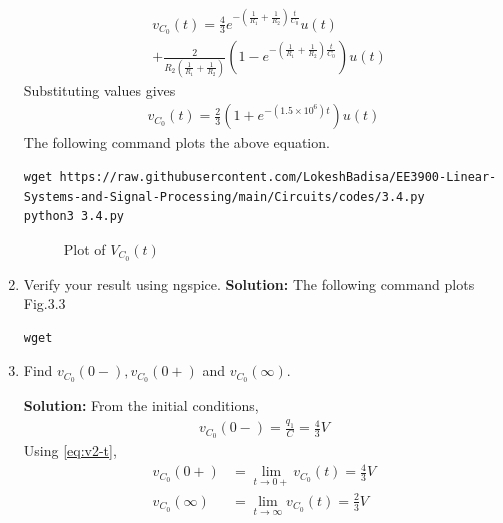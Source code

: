 \documentclass[journal,12pt,twocolumn]{IEEEtran}
\newcommand{\solution}{\noindent \textbf{Solution: }}
\providecommand{\brak}[1]{\ensuremath{\left(#1\right)}}
\numberwithin{equation}{section}
\renewcommand\thesection{\arabic{section}}
\begin{document}
\begin{enumerate}[label=\arabic*.,ref=\thesection.\theenumi]
\begin{align}
    &v_{C_0}(t) = \frac{4}{3}e^{-\brak{\frac{1}{R_1} + \frac{1}{R_2}}\frac{t}{C_0}}u(t) \nonumber \\ 
    &+ \frac{2}{R_2\brak{\frac{1}{R_1}+\frac{1}{R_2}}}\brak{1 - e^{-\brak{\frac{1}{R_1} + \frac{1}{R_2}}\frac{t}{C_0}}}u(t)
\end{align}
Substituting values gives
\begin{align}
    v_{C_0}(t) = \frac{2}{3}\brak{1 +e^{-\brak{1.5 \times 10^6}t}}u(t)
    \label{eq:v2-t}
\end{align}
The following command plots the above equation.
	\begin{lstlisting}
wget https://raw.githubusercontent.com/LokeshBadisa/EE3900-Linear-Systems-and-Signal-Processing/main/Circuits/codes/3.4.py
python3 3.4.py	
\end{lstlisting}
\begin{figure}[!ht]
			\centering
			\caption{Plot of $V_{C_0}(t)$}
\end{figure}
	\item Verify your result using ngspice.
	\solution The following command plots Fig.3.3
	\begin{lstlisting}
wget 
\end{lstlisting}
	 \begin{figure}[!ht]
			\centering
			\caption{}
\end{figure}
	\item Find $v_{C_0}(0-), v_{C_0}(0+)$ and  $v_{C_0}(\infty) $. 

\solution From the initial conditions,
\begin{align}
    v_{C_0}(0-) = \frac{q_1}{C} = {\frac{4}{3}}{V}
\end{align}
Using \eqref{eq:v2-t},
\begin{align}
    v_{C_0}(0+) &= \lim_{t \to 0+}v_{C_0}(t) = {\frac{4}{3}}{V} \\
    v_{C_0}(\infty) &= \lim_{t \to \infty}v_{C_0}(t) = {\frac{2}{3}}{V}
\end{align}


	\end{enumerate}
\end{document}
